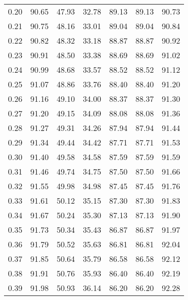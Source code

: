\begin{tabular}{|c|c|c|c|c|c|c|}
      0.20 &     90.65 &     47.93 &      32.78 &   89.13 &      89.13 &         90.73 \\
      0.21 &     90.75 &     48.16 &      33.01 &   89.04 &      89.04 &         90.84 \\
      0.22 &     90.82 &     48.32 &      33.18 &   88.87 &      88.87 &         90.92 \\
      0.23 &     90.91 &     48.50 &      33.38 &   88.69 &      88.69 &         91.02 \\
      0.24 &     90.99 &     48.68 &      33.57 &   88.52 &      88.52 &         91.12 \\
      0.25 &     91.07 &     48.86 &      33.76 &   88.40 &      88.40 &         91.20 \\
      0.26 &     91.16 &     49.10 &      34.00 &   88.37 &      88.37 &         91.30 \\
      0.27 &     91.20 &     49.15 &      34.09 &   88.08 &      88.08 &         91.36 \\
      0.28 &     91.27 &     49.31 &      34.26 &   87.94 &      87.94 &         91.44 \\
      0.29 &     91.34 &     49.44 &      34.42 &   87.71 &      87.71 &         91.53 \\
      0.30 &     91.40 &     49.58 &      34.58 &   87.59 &      87.59 &         91.59 \\
      0.31 &     91.46 &     49.74 &      34.75 &   87.50 &      87.50 &         91.66 \\
      0.32 &     91.55 &     49.98 &      34.98 &   87.45 &      87.45 &         91.76 \\
      0.33 &     91.61 &     50.12 &      35.15 &   87.30 &      87.30 &         91.83 \\
      0.34 &     91.67 &     50.24 &      35.30 &   87.13 &      87.13 &         91.90 \\
      0.35 &     91.73 &     50.34 &      35.43 &   86.87 &      86.87 &         91.97 \\
      0.36 &     91.79 &     50.52 &      35.63 &   86.81 &      86.81 &         92.04 \\
      0.37 &     91.85 &     50.64 &      35.79 &   86.58 &      86.58 &         92.12 \\
      0.38 &     91.91 &     50.76 &      35.93 &   86.40 &      86.40 &         92.19 \\
      0.39 &     91.98 &     50.93 &      36.14 &   86.20 &      86.20 &         92.28 \\

\end{tabular}
